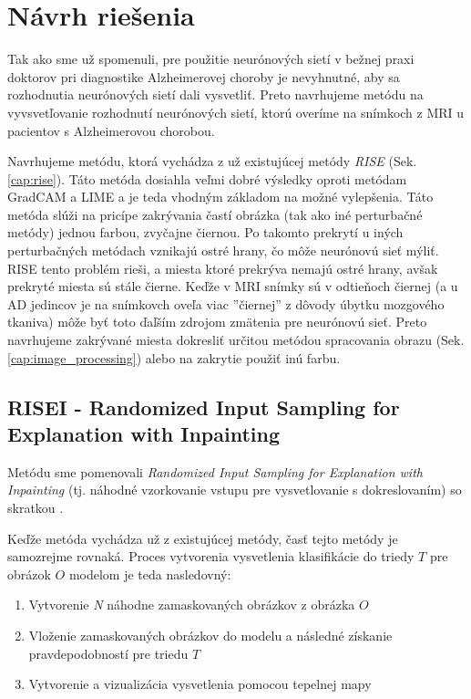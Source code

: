 \chapter{Návrh riešenia}

Tak ako sme už spomenuli, pre použitie neurónových sietí v bežnej praxi doktorov pri diagnostike Alzheimerovej choroby je nevyhnutné, aby sa rozhodnutia neurónových sietí dali vysvetliť. Preto navrhujeme metódu na vyvsvetľovanie rozhodnutí neurónových sietí, ktorú overíme na snímkoch z MRI u pacientov s Alzheimerovou chorobou.

Navrhujeme metódu, ktorá vychádza z už existujúcej metódy \textit{RISE} (Sek. \ref{cap:rise}). Táto metóda dosiahla veľmi dobré výsledky oproti metódam GradCAM a LIME a je teda vhodným základom na možné vylepšenia. Táto metóda slúži na pricípe zakrývania častí obrázka (tak ako iné perturbačné metódy) jednou farbou, zvyčajne čiernou. Po takomto prekrytí u iných perturbačných metódach vznikajú ostré hrany, čo môže neurónovú sieť mýliť. RISE tento problém rieši, a miesta ktoré prekrýva nemajú ostré hrany, avšak prekryté miesta sú stále čierne. Keďže v MRI snímky sú v odtieňoch čiernej (a u AD jedincov je na snímkovch oveľa viac ''čiernej'' z dôvody úbytku mozgového tkaniva) môže byť toto ďaľším zdrojom zmätenia pre neurónovú sieť. Preto navrhujeme zakrývané miesta dokresliť určitou metódou spracovania obrazu (Sek. \ref{cap:image_processing}) alebo na zakrytie použiť inú farbu.

\section{RISEI - Randomized Input Sampling for Explanation with Inpainting}

Metódu sme pomenovali \textit{Randomized Input Sampling for Explanation with Inpainting} (tj. náhodné vzorkovanie vstupu pre vysvetlovanie s dokreslovaním) so skratkou .

Keďže metóda vychádza už z existujúcej metódy, časť tejto metódy je samozrejme rovnaká. Proces vytvorenia vysvetlenia klasifikácie do triedy $T$ pre obrázok $O$ modelom je teda nasledovný:

\begin{enumerate}
    \item Vytvorenie \textit{N} náhodne zamaskovaných obrázkov z obrázka $O$
    \item Vloženie zamaskovaných obrázkov do modelu a následné získanie pravdepodobností pre triedu $T$
    \item Vytvorenie a vizualizácia vysvetlenia pomocou tepelnej mapy
\end{enumerate}

